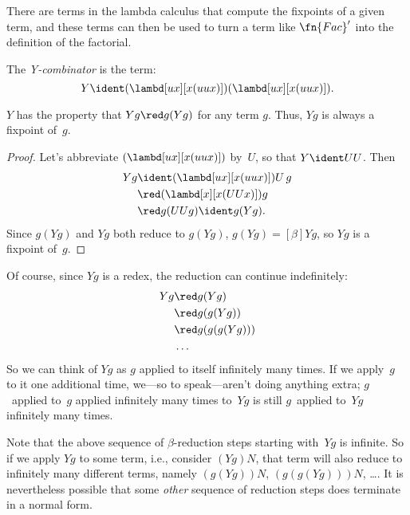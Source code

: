 \documentclass[../../../include/open-logic-section]{subfiles}
\begin{document}
There are terms in the lambda calculus that compute the fixpoints of a
given term, and these terms can then be used to turn a term like
$\fn{Fac}'$ into the definition of the factorial. 

\begin{defn}
  The \emph{Y-combinator} is the term:
  \[
  Y \ident (\lambd[ux][x(uux)])(\lambd[ux][x(uux)]).
  \]
\end{defn}

\begin{thm}
  $Y$ has the property that $Yg \red g(Yg)$ for any term $g$. Thus,
  $Yg$ is always a fixpoint of~$g$.
\end{thm}

\begin{proof}
  Let's abbreviate $(\lambd[ux][x(uux)])$ by~$U$, so that $Y \ident UU$. Then
  \begin{align*}
    Y g &\ident (\lambd[ux][x(uux)])U\,g \\
    &\red (\lambd[x][x(UUx)])g\\
    & \red g(UUg) \ident g(Yg).
  \end{align*}
  Since $g(Yg)$ and $Yg$ both reduce to $g(Yg)$, $g(Yg) \equal[\beta]
  Yg$, so $Yg$ is a fixpoint of~$g$.
\end{proof}

Of course, since $Yg$ is a redex, the reduction can continue indefinitely:
\begin{align*}
  Y g &\red g (Y g) \\
    &\red g (g (Y g)) \\
    &\red g(g (g (Y g)))\\
    &\ldots
\end{align*}
So we can think of $Yg$ as $g$ applied to itself infinitely many
times. If we apply~$g$ to it one additional time, we---so to
speak---aren't doing anything extra; $g$~applied to~$g$ applied
infinitely many times to~$Yg$ is still $g$~applied to~$Yg$ infinitely
many times.

Note that the above sequence of $\beta$-reduction steps starting
with~$Yg$ is infinite. So if we apply $Yg$ to some term, i.e.,
consider $(Yg)N$, that term will also reduce to infinitely many
different terms, namely $(g(Yg))N$, $(g(g(Yg)))N$, \dots. It is
nevertheless possible that some \emph{other} sequence of reduction
steps does terminate in a normal form.
\end{document}
